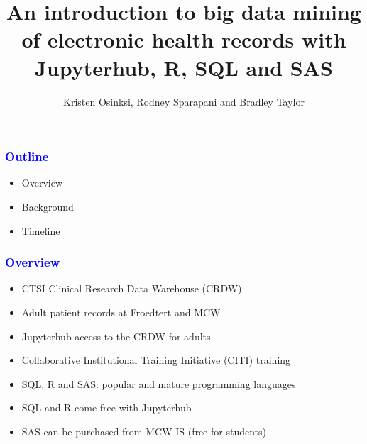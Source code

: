 \documentclass[11pt,pdftex,dvipsnames,usenames]{beamer}
\title{An introduction to big data mining of electronic health records with
Jupyterhub, R, SQL and SAS}
\author{Kristen Osinksi, Rodney Sparapani and Bradley Taylor}
\begin{document}


\titlepage
\boldmath
\begin{frame}[fragile]\frametitle{\bf\textcolor{blue}{Outline}}

\begin{itemize}
\item Overview
\item Background
\item Timeline
\end{itemize}

\end{frame}


\begin{frame}[fragile]\frametitle{\bf\textcolor{blue}{Overview}}

\begin{itemize}
\item CTSI Clinical Research Data Warehouse (CRDW)
\item Adult patient records at Froedtert and MCW
\item Jupyterhub access to the CRDW for adults
\item Collaborative Institutional Training Initiative (CITI) training
\item SQL, R and SAS: popular and mature programming languages
\item SQL and R come free with Jupyterhub
\item SAS can be purchased from MCW IS (free for students)
\end{itemize}

\end{frame}
\end{document}
